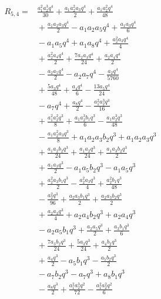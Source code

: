 \begin{align*}
R_{5,4}={}& \frac{a_{1}^{2} a_{2}^{3} q^{4}}{30} + \frac{a_{1} a_{2}^{2} a_{3} q^{4}}{2} + \frac{a_{1} a_{2}^{2} q^{4}}{48}\\
&{}+ \frac{a_{1} a_{2} a_{3} q^{4}}{2} - a_{1} a_{2} a_{5} q^{4} + \frac{a_{1} a_{3} q^{4}}{6}\\
&{}- a_{1} a_{5} q^{4} + a_{1} a_{8} q^{4} + \frac{a_{2}^{2} a_{3} q^{4}}{4}\\
&{}+ \frac{a_{2}^{2} a_{4} q^{4}}{2} + \frac{7 a_{2} a_{3} q^{4}}{24} + \frac{a_{2} a_{4} q^{4}}{2}\\
&{}- \frac{a_{2} a_{5} q^{4}}{2} - a_{2} a_{7} q^{4} - \frac{a_{2} q^{4}}{5760}\\
&{}+ \frac{5 a_{3} q^{4}}{48} + \frac{a_{4} q^{4}}{6} - \frac{13 a_{5} q^{4}}{24}\\
&{}- a_{7} q^{4} + \frac{a_{8} q^{4}}{2} - \frac{a_{1}^{2} a_{2}^{3} q^{3}}{16}\\
&{}+ \frac{a_{1}^{2} a_{2}^{2} q^{3}}{8} + \frac{a_{1} a_{2}^{3} b_{1} q^{3}}{6} - \frac{a_{1} a_{2}^{3} q^{3}}{48}\\
&{}- \frac{a_{1} a_{2}^{2} a_{3} q^{3}}{8} + a_{1} a_{2} a_{3} b_{2} q^{3} + a_{1} a_{2} a_{3} q^{3}\\
&{}+ \frac{a_{1} a_{2} b_{2} q^{3}}{24} + \frac{a_{1} a_{2} q^{3}}{24} + \frac{a_{1} a_{3} b_{2} q^{3}}{2}\\
&{}+ \frac{a_{1} a_{3} q^{3}}{2} - a_{1} a_{5} b_{2} q^{3} - a_{1} a_{5} q^{3}\\
&{}+ \frac{a_{2}^{2} a_{3} b_{1} q^{3}}{2} - \frac{a_{2}^{2} a_{3} q^{3}}{4} + \frac{a_{2}^{2} b_{1} q^{3}}{48}\\
&{}- \frac{a_{2}^{2} q^{3}}{96} + \frac{a_{2} a_{3} b_{1} q^{3}}{2} + \frac{a_{2} a_{3} b_{2} q^{3}}{2}\\
&{}+ \frac{a_{2} a_{3} q^{3}}{4} + a_{2} a_{4} b_{2} q^{3} + a_{2} a_{4} q^{3}\\
&{}- a_{2} a_{5} b_{1} q^{3} + \frac{a_{2} a_{5} q^{3}}{2} + \frac{a_{3} b_{1} q^{3}}{6}\\
&{}+ \frac{7 a_{3} b_{2} q^{3}}{24} + \frac{5 a_{3} q^{3}}{24} + \frac{a_{4} b_{2} q^{3}}{2}\\
&{}+ \frac{a_{4} q^{3}}{2} - a_{5} b_{1} q^{3} - \frac{a_{5} b_{2} q^{3}}{2}\\
&{}- a_{7} b_{2} q^{3} - a_{7} q^{3} + a_{8} b_{1} q^{3}\\
&{}- \frac{a_{8} q^{3}}{2} + \frac{a_{1}^{2} a_{2}^{3} q^{2}}{72} - \frac{a_{1}^{2} a_{2}^{2} q^{2}}{6}\\

\end{align*}

